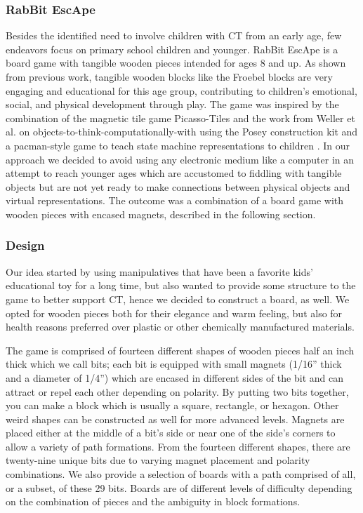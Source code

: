 \documentclass{acm_proc_article-sp}
\begin{document}
\subsubsection{RabBit EscApe}
Besides the identified need to involve children with CT from an early age, few endeavors focus on primary school children and younger. RabBit EscApe is a board game with tangible wooden pieces intended for ages 8 and up. As shown from previous work, tangible wooden blocks like the Froebel blocks\cite{liebschner1992child} are very engaging and educational for this age group, contributing to children's emotional, social, and physical development through play. The game was inspired by the combination of the magnetic tile game Picasso-Tiles\cite{picassotiles3d} and the work from Weller et al. on objects-to-think-computationally-with using the Posey construction kit and a pacman-style game to teach state machine representations to children \cite{weller2008escape}. In our approach we decided to avoid using any electronic medium like a computer in an attempt to reach younger ages which are accustomed to fiddling with tangible objects but are not yet ready to make connections between physical objects and virtual representations. The outcome was a combination of a board game with wooden pieces with encased magnets, described in the following section.

\subsubsection{Design}
Our idea started by using manipulatives that have been a favorite kids' educational toy for a long time, but also wanted to provide some structure to the game to better support CT, hence we decided to construct a board, as well. We opted for wooden pieces both for their elegance and warm feeling, but also for health reasons preferred over plastic or other chemically manufactured materials. 

The game is comprised of fourteen different shapes of wooden pieces half an inch thick which we call bits; each bit is equipped with small magnets (1/16'' thick and a diameter of 1/4'') which are encased in different sides of the bit and can attract or repel each other depending on polarity. By putting two bits together, you can make a block which is usually a square, rectangle, or hexagon. Other weird shapes can be constructed as well for more advanced levels. Magnets are placed either at the middle of a bit's side or near one of the side's corners to allow a variety of path formations. From the fourteen different shapes, there are twenty-nine unique bits due to varying magnet placement and polarity combinations. We also provide a selection of boards with a path comprised of all, or a subset, of these 29 bits. Boards are of different levels of difficulty depending on the combination of pieces and the ambiguity in block formations.
\end{document}
